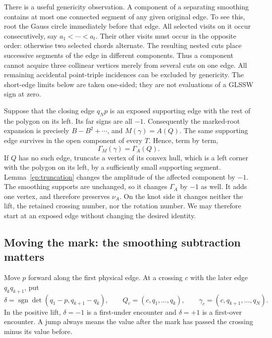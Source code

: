 \documentclass[11pt,letterpaper]{article}
\numberwithin{equation}{section}
\theoremstyle{definition}
\theoremstyle{remark}
\begin{document}
There is a useful genericity observation.  A component of a separating
smoothing contains at most one connected segment of any given original
edge.  To see this, root the Gauss circle immediately before that edge.
All selected visits on it occur consecutively, say $a_1<\cdots<a_t$.
Their other visits must occur in the opposite order: otherwise two
selected chords alternate.  The resulting nested cuts place successive
segments of the edge in different components.  Thus a component cannot
acquire three collinear vertices merely from several cuts on one edge.
All remaining accidental point-triple incidences can be excluded by
genericity.  The short-edge limits below are taken one-sided; they are
not evaluations of a GLSSW sign at zero.

Suppose that the closing edge $q_Np$ is an exposed supporting edge with
the rest of the polygon on its left.  Its far signs are all $-1$.
Consequently the marked-root expansion is precisely
$B-B^2+\cdots$, and $M(\gamma)=A(Q)$.  The same supporting edge survives in
the open component of every $T$.  Hence, term by term,
\begin{equation}
 \Gamma_M(\gamma)=\Gamma_A(Q).
 \label{un:initial}
\end{equation}
If $Q$ has no such edge, truncate a vertex of its convex hull, which is a
left corner with the polygon on its left, by a sufficiently small
supporting segment.  Lemma~\ref{ep:truncation} changes the amplitude
of the affected component by $-1$.  The smoothing supports are unchanged,
so it changes $\Gamma_A$ by $-1$ as well.  It adds one vertex, and
therefore preserves $\nu_A$.  On the knot side it changes neither the
lift, the retained crossing number, nor the rotation number.  We may
therefore start at an exposed edge without changing the desired identity.

\subsection{Moving the mark: the smoothing subtraction matters}
\label{un:transport}

Move $p$ forward along the first physical edge.  At a crossing $c$ with
the later edge $q_kq_{k+1}$, put
\begin{equation}
 \delta=\operatorname{sgn}\det(q_1-p,q_{k+1}-q_k),\qquad
 Q_c=(c,q_1,\ldots,q_k),\qquad
 \gamma_c=(c,q_{k+1},\ldots,q_N).
 \label{un:crossing-data}
\end{equation}
In the positive lift, $\delta=-1$ is a first-under encounter and
$\delta=+1$ is a first-over encounter.  A jump always means the value
after the mark has passed the crossing minus its value before.
\end{document}
